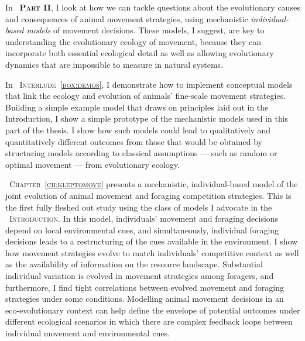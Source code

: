 
\medskip

\noindent In {\scshape~\textbf{Part II}}, I look at how we can tackle questions about the evolutionary causes and consequences of animal movement strategies, using mechanistic \textit{individual-based models} of movement decisions.
These models, I suggest, are key to understanding the evolutionary ecology of movement, because they can incorporate both essential ecological detail as well as allowing evolutionary dynamics that are impossible to measure in natural systems.

\medskip

In {\scshape~Interlude~\ref{box:demos}}, I demonstrate how to implement conceptual models that link the ecology and evolution of animals' fine-scale movement strategies.
Building a simple example model that draws on principles laid out in the Introduction, I show a simple prototype of the mechanistic models used in this part of the thesis.
I show how such models could lead to qualitatively and quantitatively different outcomes from those that would be obtained by structuring models according to classical assumptions --- such as random or optimal movement --- from evolutionary ecology.

\medskip

{\scshape~Chapter~\ref{ch:kleptomove}} presents a mechanistic, individual-based model of the joint evolution of animal movement and foraging competition strategies.
This is the first fully fleshed out study using the class of models I advocate in the {\scshape~Introduction}.
In this model, individuals' movement and foraging decisions depend on local environmental cues, and simultaneously, individual foraging decisions leads to a restructuring of the cues available in the environment.
I show how movement strategies evolve to match individuals' competitive context as well as the availability of information on the resource landscape.
Substantial individual variation is evolved in movement strategies among foragers, and furthermore, I find tight correlations between evolved movement and foraging strategies under some conditions.
Modelling animal movement decisions in an eco-evolutionary context can help define the envelope of potential outcomes under different ecological scenarios in which there are complex feedback loops between individual movement and environmental cues.

